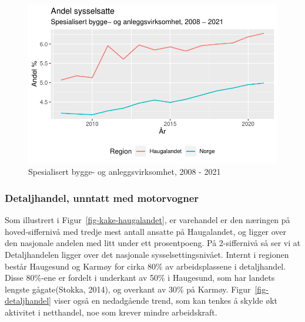 \documentclass[
]{article}
\begin{document}
\begin{figure}[H]

{\centering \includegraphics{Masteroppgave_files/figure-pdf/fig-bygg_og_anlegg-1.pdf}

}

\caption{\label{fig-bygg_og_anlegg}Spesialisert bygge- og
anleggsvirksomhet, 2008 - 2021}

\end{figure}

\hypertarget{detaljhandel-unntatt-med-motorvogner}{%
\subsubsection{Detaljhandel, unntatt med
motorvogner}\label{detaljhandel-unntatt-med-motorvogner}}

Som illustrert i Figur~\ref{fig-kake-haugalandet}, er varehandel er den
næringen på hoved-siffernivå med tredje mest antall ansatte på
Haugalandet, og ligger over den nasjonale andelen med litt under ett
prosentpoeng. På 2-siffernivå så ser vi at Detaljhandelen ligger over
det nasjonale sysselsettingsnivået. Internt i regionen består Haugesund
og Karmøy for cirka 80\% av arbeidsplassene i detaljhandel. Disse
80\%-ene er fordelt i underkant av 50\% i Haugesund, som har landets
lengste gågate(Stokka, 2014), og overkant av 30\% på Karmøy.
Figur~\ref{fig-detaljhandel} viser også en nedadgående trend, som kan
tenkes å skylde økt aktivitet i netthandel, noe som krever mindre
arbeidskraft.
\end{document}
